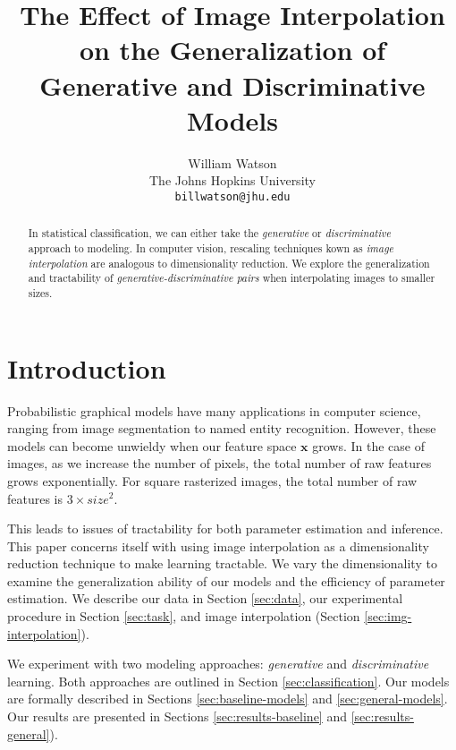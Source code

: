 \documentclass{article}
\title{The Effect of Image Interpolation on the Generalization of Generative and Discriminative Models}
\author{%
  William Watson \\
  The Johns Hopkins University\\
  \texttt{billwatson@jhu.edu} \\
}
\begin{document}

\maketitle

\begin{abstract}
  In statistical classification, we can either take the \textit{generative}
  or \textit{discriminative} approach to modeling. In computer vision, rescaling
  techniques kown as \textit{image interpolation} are analogous to
  dimensionality reduction. We explore the generalization and tractability of
  \textit{generative-discriminative pairs} when interpolating images to smaller
  sizes.
\end{abstract}



\section{Introduction}
\label{sec:intro}
Probabilistic graphical models have many applications in computer science,
ranging from image segmentation to named entity recognition. However, these
models can become unwieldy when our feature space $\mathbf{x}$ grows. In the
case of images, as we increase the number of pixels, the
total number of raw features grows exponentially. For square rasterized images,
the total number of raw features is $3 \times size^2$.

This leads to issues of tractability for both parameter estimation and
inference. This paper concerns itself with using image interpolation as
a dimensionality reduction technique to make learning tractable. We vary the
dimensionality to examine the generalization ability of our models and the
efficiency of parameter estimation. We describe our data in Section \ref{sec:data},
our experimental procedure in Section \ref{sec:task}, and image interpolation
(Section \ref{sec:img-interpolation}).

We experiment with two modeling approaches: \textit{generative}
and \textit{discriminative} learning. Both approaches are outlined in Section
\ref{sec:classification}. Our models are formally described in Sections
\ref{sec:baseline-models} and \ref{sec:general-models}. Our results
are presented in Sections \ref{sec:results-baseline} and \ref{sec:results-general}).
\end{document}
